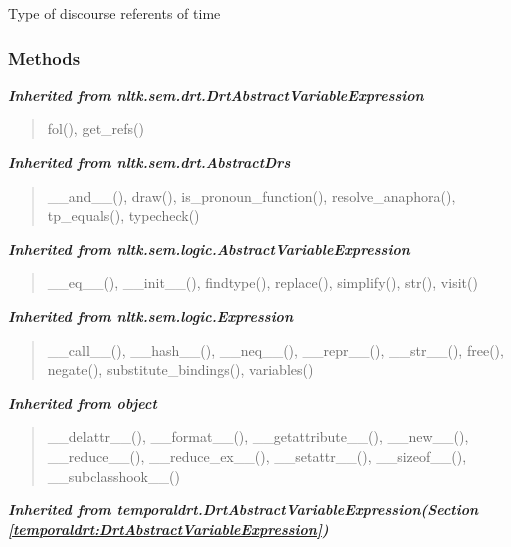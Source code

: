 Type of discourse referents of time



  \subsubsection{Methods}


\large{\textbf{\textit{Inherited from nltk.sem.drt.DrtAbstractVariableExpression}}}

\begin{quote}
fol(), get\_refs()
\end{quote}

\large{\textbf{\textit{Inherited from nltk.sem.drt.AbstractDrs}}}

\begin{quote}
\_\_and\_\_(), draw(), is\_pronoun\_function(), resolve\_anaphora(), tp\_equals(), typecheck()
\end{quote}

\large{\textbf{\textit{Inherited from nltk.sem.logic.AbstractVariableExpression}}}

\begin{quote}
\_\_eq\_\_(), \_\_init\_\_(), findtype(), replace(), simplify(), str(), visit()
\end{quote}

\large{\textbf{\textit{Inherited from nltk.sem.logic.Expression}}}

\begin{quote}
\_\_call\_\_(), \_\_hash\_\_(), \_\_neq\_\_(), \_\_repr\_\_(), \_\_str\_\_(), free(), negate(), substitute\_bindings(), variables()
\end{quote}

\large{\textbf{\textit{Inherited from object}}}

\begin{quote}
\_\_delattr\_\_(), \_\_format\_\_(), \_\_getattribute\_\_(), \_\_new\_\_(), \_\_reduce\_\_(), \_\_reduce\_ex\_\_(), \_\_setattr\_\_(), \_\_sizeof\_\_(), \_\_subclasshook\_\_()
\end{quote}

\large{\textbf{\textit{Inherited from temporaldrt.DrtAbstractVariableExpression\textit{(Section \ref{temporaldrt:DrtAbstractVariableExpression})}}}}

    \vspace{0.5ex}

